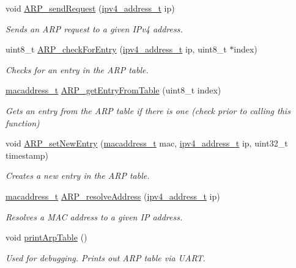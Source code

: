 \begin{DoxyCompactItemize}
void \mbox{\hyperlink{group__arp_ga1b3f3b5557d3cabb25df6b8f2af655bd}{A\+R\+P\+\_\+send\+Request}} (\mbox{\hyperlink{group__ipv4_gad9df0882950e70d0587a4b423beb261a}{ipv4\+\_\+address\+\_\+t}} ip)
\begin{DoxyCompactList}\small\item\em Sends an A\+RP request to a given I\+Pv4 address. \end{DoxyCompactList}\item 
uint8\+\_\+t \mbox{\hyperlink{group__arp_gaa50891c65dcfb449eb93a4d5aed366f5}{A\+R\+P\+\_\+check\+For\+Entry}} (\mbox{\hyperlink{group__ipv4_gad9df0882950e70d0587a4b423beb261a}{ipv4\+\_\+address\+\_\+t}} ip, uint8\+\_\+t $\ast$index)
\begin{DoxyCompactList}\small\item\em Checks for an entry in the A\+RP table. \end{DoxyCompactList}\item 
\mbox{\hyperlink{group__ethernet_gacb865bcbf50a6c8cef05581bfabff373}{macaddress\+\_\+t}} \mbox{\hyperlink{group__arp_ga31f6f62d984dfbf0fb3791452a0f09e2}{A\+R\+P\+\_\+get\+Entry\+From\+Table}} (uint8\+\_\+t index)
\begin{DoxyCompactList}\small\item\em Gets an entry from the A\+RP table if there is one (check prior to calling this function) \end{DoxyCompactList}\item 
void \mbox{\hyperlink{group__arp_gab2b7bec25bda36bd23dc59cfe7353e66}{A\+R\+P\+\_\+set\+New\+Entry}} (\mbox{\hyperlink{group__ethernet_gacb865bcbf50a6c8cef05581bfabff373}{macaddress\+\_\+t}} mac, \mbox{\hyperlink{group__ipv4_gad9df0882950e70d0587a4b423beb261a}{ipv4\+\_\+address\+\_\+t}} ip, uint32\+\_\+t timestamp)
\begin{DoxyCompactList}\small\item\em Creates a new entry in the A\+RP table. \end{DoxyCompactList}\item 
\mbox{\hyperlink{group__ethernet_gacb865bcbf50a6c8cef05581bfabff373}{macaddress\+\_\+t}} \mbox{\hyperlink{group__arp_ga050b0c9b4cc725837f257ab6f576df31}{A\+R\+P\+\_\+resolve\+Address}} (\mbox{\hyperlink{group__ipv4_gad9df0882950e70d0587a4b423beb261a}{ipv4\+\_\+address\+\_\+t}} ip)
\begin{DoxyCompactList}\small\item\em Resolves a M\+AC address to a given IP address. \end{DoxyCompactList}\item 
void \mbox{\hyperlink{group__arp_gad629320d0e251b055167216baa76aff3}{print\+Arp\+Table}} ()
\begin{DoxyCompactList}\small\item\em Used for debugging. Prints out A\+RP table via U\+A\+RT. \end{DoxyCompactList}\end{DoxyCompactItemize}
